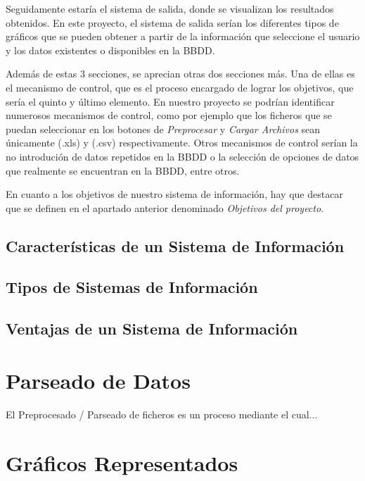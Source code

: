 Seguidamente estaría el sistema de salida, donde se visualizan los resultados obtenidos. En este proyecto, el sistema de salida serían los diferentes tipos de gráficos que se pueden obtener a partir de la información que seleccione el usuario y los datos existentes o disponibles en la BBDD.

Además de estas 3 secciones, se aprecian otras dos secciones más. Una de ellas es el mecanismo de control, que es el proceso encargado de lograr los objetivos, que sería el quinto y último elemento.
En nuestro proyecto se podrían identificar numerosos mecanismos de control, como por ejemplo que los ficheros que se puedan seleccionar en los botones de \emph{Preprocesar} y \emph{Cargar Archivos} sean únicamente (.xls) y (.csv) respectivamente. Otros mecanismos de control serían la no introdución de datos repetidos en la BBDD o la selección de opciones de datos que realmente se encuentran en la BBDD, entre otros.

En cuanto a los objetivos de nuestro sistema de información, hay que destacar que se definen en el apartado anterior denominado \emph{Objetivos del proyecto}.

\subsection{Características de un Sistema de Información}



\subsection{Tipos de Sistemas de Información}



\subsection{Ventajas de un Sistema de Información}



\section{Parseado de Datos}
El Preprocesado / Parseado de ficheros es un proceso mediante el cual...





\section{Gráficos Representados}

